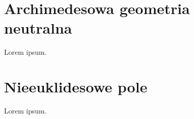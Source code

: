 \documentclass{LegrandOrangeBook}
\begin{document}
\chapter{Archimedesowa geometria neutralna}
Lorem ipsum.

\chapter{Nieeuklidesowe pole}
Lorem ipsum.




















































{}


\raggedright
{}
\printindex

\printindex[persons]
\end{document}
